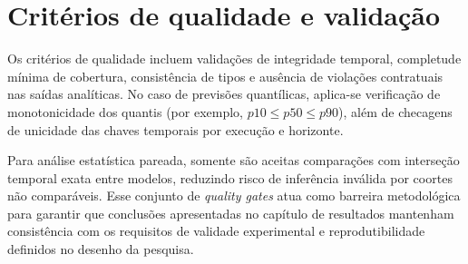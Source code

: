 \section{Critérios de qualidade e validação}
Os critérios de qualidade incluem validações de integridade temporal, completude mínima de cobertura, consistência de tipos e ausência de violações contratuais nas saídas analíticas. No caso de previsões quantílicas, aplica-se verificação de monotonicidade dos quantis (por exemplo, \(p10 \leq p50 \leq p90\)), além de checagens de unicidade das chaves temporais por execução e horizonte.

Para análise estatística pareada, somente são aceitas comparações com interseção temporal exata entre modelos, reduzindo risco de inferência inválida por coortes não comparáveis. Esse conjunto de \textit{quality gates} atua como barreira metodológica para garantir que conclusões apresentadas no capítulo de resultados mantenham consistência com os requisitos de validade experimental e reprodutibilidade definidos no desenho da pesquisa.
